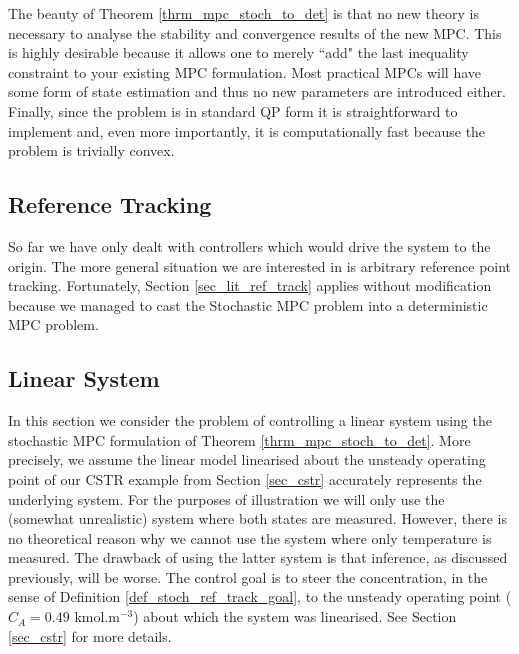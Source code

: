 The beauty of Theorem \ref{thrm_mpc_stoch_to_det} is that no new theory is necessary to analyse the stability and convergence results of the new MPC. This is highly desirable because it allows one to merely ``add" the last inequality constraint to your existing MPC formulation. Most practical MPCs will have some form of state estimation and thus no new parameters are introduced either. Finally, since the problem is in standard QP form it is straightforward to implement and, even more importantly, it is computationally fast because the problem is trivially convex. 
\subsection{Reference Tracking}
So far we have only dealt with controllers which would drive the system to the origin. The more general situation we are interested in is arbitrary reference point tracking. Fortunately, Section \ref{sec_lit_ref_track} applies without modification because we managed to cast the Stochastic MPC problem into a deterministic MPC problem. 

\subsection{Linear System}
In this section we consider the problem of controlling a linear system using the stochastic MPC formulation of Theorem \ref{thrm_mpc_stoch_to_det}. More precisely, we assume the linear model linearised about the unsteady operating point of our CSTR example from Section \ref{sec_cstr} accurately represents the underlying system. For the purposes of illustration we will only use the (somewhat unrealistic) system where both states are measured. However, there is no theoretical reason why we cannot use the system where only temperature is measured. The drawback of using the latter system is that inference, as discussed previously, will be worse. The control goal is to steer the concentration, in the sense of Definition \ref{def_stoch_ref_track_goal}, to the unsteady operating point ($C_A = 0.49$ kmol.m$^{-3}$) about which the system was linearised. See Section \ref{sec_cstr} for more details.

